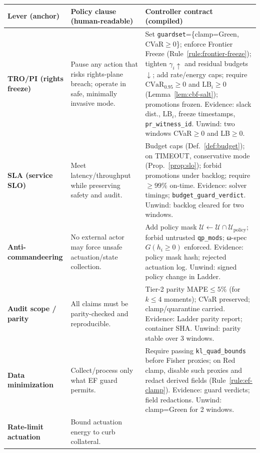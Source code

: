 \documentclass[10pt]{article}
\begin{document}
\begin{table}[t]
\centering
\renewcommand{\arraystretch}{1.12}
\begin{tabularx}{\textwidth}{@{}>{\raggedright\arraybackslash}p{2.8cm} >{\raggedright\arraybackslash}p{4.6cm} >{\raggedright\arraybackslash}X@{}}
\toprule
\textbf{Lever (anchor)} & \textbf{Policy clause (human-readable)} & \textbf{Controller contract (compiled)} \\
\midrule
\textbf{TRO/PI (rights freeze)} &
Pause any action that risks rights-plane breach; operate in safe, minimally invasive mode. &
Set \texttt{guardset}=\{clamp=Green, CVaR$\ge0$\}; enforce Frontier Freeze (Rule~\ref{rule:frontier-freeze}); tighten $\gamma_i\!\uparrow$ and residual budgets $\downarrow$; add rate/energy caps; require $\mathrm{CVaR}_{0.95}\!\ge0$ and $\mathrm{LB}_i\!\ge0$ (Lemma~\ref{lem:cbf-salt}); promotions frozen. Evidence: slack dist., $\mathrm{LB}_i$, freeze timestamps, \texttt{pr\_witness\_id}. Unwind: two windows CVaR$\ge0$ and LB$\ge0$. \\
\addlinespace
\textbf{SLA (service SLO)} &
Meet latency/throughput while preserving safety and audit. &
Budget caps (Def.~\ref{def:budget}); on TIMEOUT, conservative mode (Prop.~\ref{prop:slo}); forbid promotions under backlog; require $\ge99\%$ on-time. Evidence: solver timings; \texttt{budget\_guard\_verdict}. Unwind: backlog cleared for two windows. \\
\addlinespace
\textbf{Anti-commandeering} &
No external actor may force unsafe actuation/state collection. &
Add policy mask $\mathcal U\leftarrow \mathcal U\cap \mathcal U_{\mathrm{policy}}$; forbid untrusted \texttt{qp\_mods}; ω-spec $G(h_i\!\ge0)$ enforced. Evidence: policy mask hash; rejected actuation log. Unwind: signed policy change in Ladder. \\
\addlinespace
\textbf{Audit scope / parity} &
All claims must be parity-checked and reproducible. &
Tier-2 parity MAPE$\le5\%$ (for $k\!\le\!4$ moments); CVaR preserved; clamp/quarantine carried. Evidence: Ladder parity report; container SHA. Unwind: parity stable over 3 windows. \\
\addlinespace
\textbf{Data minimization} &
Collect/process only what EF guard permits. &
Require passing \texttt{kl\_quad\_bounds} before Fisher proxies; on Red clamp, disable such proxies and redact derived fields (Rule~\ref{rule:ef-clamp}). Evidence: guard verdicts; field redactions. Unwind: clamp=Green for 2 windows. \\
\addlinespace
\textbf{Rate-limit actuation} &
Bound actuation energy to curb collateral. &

\end{tabularx}
\end{table}
\end{document}

